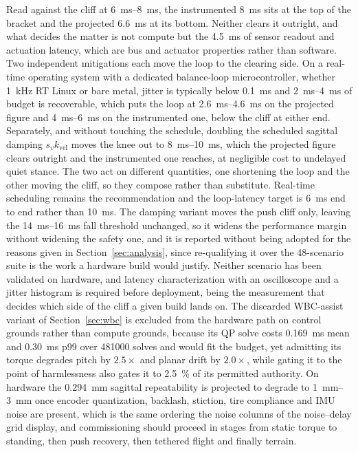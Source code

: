 \documentclass[a4paper,fleqn]{cas-dc}
\begin{document}
Read against the cliff at \SIrange{6}{8}{ms}, the instrumented \SI{8}{ms} sits
at the top of the bracket and the projected \SI{6.6}{ms} at its bottom. Neither
clears it outright, and what decides the matter is not compute but the
\SI{4.5}{ms} of sensor readout and actuation latency, which are bus and actuator
properties rather than software. Two independent mitigations each move the loop
to the clearing side. On a real-time operating system with a dedicated
balance-loop microcontroller, whether \SI{1}{kHz} RT Linux or bare metal, jitter
is typically below \SI{0.1}{ms} and \SIrange{2}{4}{ms} of budget is recoverable,
which puts the loop at \SIrange{2.6}{4.6}{ms} on the projected figure and
\SIrange{4}{6}{ms} on the instrumented one, below the cliff at either end.
Separately, and without touching the schedule, doubling the scheduled sagittal
damping $s_v k_{\text{vel}}$ moves the knee out to \SIrange{8}{10}{ms}, which
the projected figure clears outright and the instrumented one reaches, at
negligible cost to undelayed quiet stance.
The two act on different quantities, one shortening the loop and the other
moving the cliff, so they compose rather than substitute. Real-time scheduling
remains the recommendation and the loop-latency target is \SI{6}{ms} end to end
rather than \SI{10}{ms}. The damping variant moves the push cliff only, leaving
the \SIrange{14}{16}{ms} fall threshold unchanged, so it widens the performance
margin without widening the safety one, and it is reported without being adopted
for the reasons given in Section~\ref{sec:analysis}, since re-qualifying it over
the \num{48}-scenario suite is the work a hardware build would justify. Neither
scenario has been validated on hardware, and latency characterization with an
oscilloscope and a jitter histogram is required before deployment, being the
measurement that decides which side of the cliff a given build lands on. The
discarded WBC-assist variant of Section~\ref{sec:wbc} is excluded from the
hardware path on control grounds rather than compute grounds, because its QP
solve costs \SI{0.169}{ms} mean and \SI{0.30}{ms} p99 over \num{481000} solves
and would fit the budget, yet admitting its torque degrades pitch by
$\num{2.5}\times$ and planar drift by $\num{2.0}\times$, while gating it to the
point of harmlessness also gates it to \SI{2.5}{\percent} of its permitted
authority. On hardware the \SI{0.294}{mm} sagittal repeatability is projected to
degrade to \SIrange{1}{3}{mm} once encoder quantization, backlash, stiction,
tire compliance and IMU noise are present, which is the same ordering the noise
columns of the noise--delay grid display, and commissioning should proceed
in stages from static torque to standing, then push recovery, then tethered
flight and finally terrain.
\end{document}
